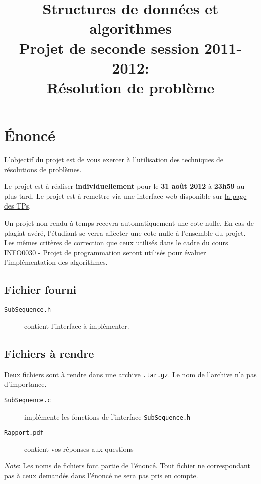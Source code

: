 \documentclass[a4paper,10pt]{article}
\title{
    \textbf{Structures de données et algorithmes}\\
    Projet de seconde session 2011-2012:\\Résolution de problème
}
\begin{document}
\maketitle

\section*{\'Enoncé}

L'objectif du projet est de vous exercer à l'utilisation des techniques de résolutions de problèmes.

Le projet est à réaliser {\bf individuellement} pour le {\bf 31 août
  2012} à {\bf 23h59} au plus tard. Le projet est à remettre via une
interface web disponible sur
\href{http://www.montefiore.ulg.ac.be/~glouppe/2011-2012/students.info0902.php}{la
  page des TPs}.

Un projet non rendu à temps recevra automatiquement une cote nulle. En cas de
plagiat avéré, l'étudiant se verra affecter une cote nulle à l'ensemble du
projet. Les mêmes critères de correction que ceux utilisés dans le cadre du
cours \href{http://www.montefiore.ulg.ac.be/~info0030/}{INFO0030 - Projet de programmation}
seront utilisés pour évaluer l'implémentation des algorithmes.

\subsection*{Fichier fourni}
\begin{description}
\item[\texttt{SubSequence.h}] contient l'interface à implémenter.
\end{description}
\subsection*{Fichiers à rendre}
Deux fichiers sont à rendre dans une archive \texttt{.tar.gz}. Le nom de l'archive n'a pas d'importance.
\begin{description}
\item[\texttt{SubSequence.c}] implémente les fonctions de l'interface \texttt{SubSequence.h}
\item[\texttt{Rapport.pdf}] contient vos réponses aux questions
\end{description}

{\em Note}: Les noms de fichiers font partie de l'énoncé. Tout fichier ne
correspondant pas à ceux demandés dans l'énoncé ne sera pas pris en compte.
\end{document}
